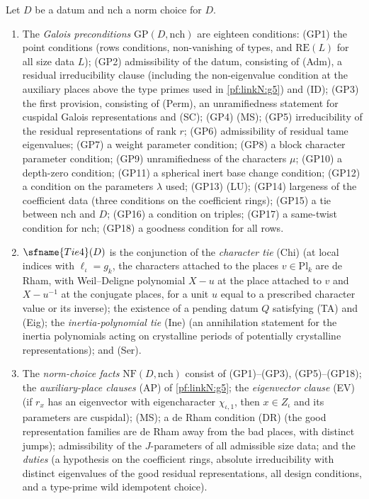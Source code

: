 \begin{definition}\label{pf:linkN:GP}
Let $D$ be a datum and $\mathrm{nch}$ a norm choice for $D$.
\begin{enumerate}[label=(\alph*)]
\item The \emph{Galois preconditions} $\mathrm{GP}(D,\mathrm{nch})$ are eighteen conditions: (GP1) the point conditions (rows
conditions, non-vanishing of types, and $\mathrm{RE}(L)$ for all size data $L$); (GP2) admissibility of the datum, consisting of
(Adm), a residual irreducibility clause (including the non-eigenvalue condition at the auxiliary places above the type primes
used in \cref{pf:linkN:g5}) and (ID); (GP3) the first provision, consisting of (Perm), an unramifiedness statement for cuspidal
Galois representations and (SC); (GP4) (MS); (GP5) irreducibility of the residual representations of rank $r$; (GP6)
admissibility of residual tame eigenvalues; (GP7) a weight parameter condition; (GP8) a block character parameter condition;
(GP9) unramifiedness of the characters $\mu$; (GP10) a depth-zero condition; (GP11) a spherical inert base change condition;
(GP12) a condition on the parameters $\lambda$ used; (GP13) (LU); (GP14) largeness of the coefficient data (three conditions
on the coefficient rings); (GP15) a tie between $\mathrm{nch}$ and $D$; (GP16) a condition on triples; (GP17) a same-twist
condition for $\mathrm{nch}$; (GP18) a goodness condition for all rows.
\item $\sfname{Tie4}(D)$ is the conjunction of the \emph{character tie} (Chi) (at local indices with $\ell_\iota=g_k$, the
characters attached to the places $v\in\mathrm{Pl}_k$ are de Rham, with Weil--Deligne polynomial $X-u$ at the place attached to
$v$ and $X-u^{-1}$ at the conjugate places, for a unit $u$ equal to a prescribed character value or its inverse); the existence
of a pending datum $Q$ satisfying (TA) and (Eig); the \emph{inertia-polynomial tie} (Ine) (an annihilation statement for the
inertia polynomials acting on crystalline periods of potentially crystalline representations); and (Ser).
\item The \emph{norm-choice facts} $\mathrm{NF}(D,\mathrm{nch})$ consist of (GP1)--(GP3), (GP5)--(GP18); the
\emph{auxiliary-place clauses} (AP) of \cref{pf:linkN:g5}; the \emph{eigenvector clause} (EV) (if $r_x$ has an eigenvector with
eigencharacter $\chi_{\iota,1}$, then $x\in Z_\iota$ and its parameters are cuspidal); (MS); a de Rham condition (DR) (the good
representation families are de Rham away from the bad places, with distinct jumps); admissibility of the $J$-parameters of all
admissible size data; and the \emph{duties} (a hypothesis on the coefficient rings, absolute irreducibility with distinct
eigenvalues of the good residual representations, all design conditions, and a type-prime wild idempotent choice).
\end{enumerate}
\end{definition}

